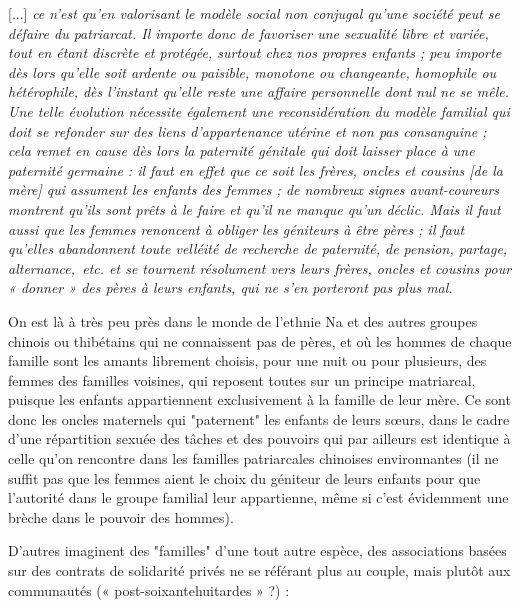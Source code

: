 \begin{displayquote}
{[...] \emph{ce n'est qu'en valorisant le modèle social non conjugal qu'une société peut se défaire du patriarcat. Il importe donc de favoriser une sexualité libre et variée, tout en étant discrète et protégée, surtout chez nos propres enfants ; peu importe dès lors qu'elle soit ardente ou paisible, monotone ou changeante, homophile ou hétérophile, dès l'instant qu'elle reste une affaire personnelle dont nul ne se mêle. Une telle évolution nécessite également une reconsidération du modèle familial qui doit se refonder sur des liens d'appartenance utérine et non pas consanguine ; cela remet en cause dès lors la paternité génitale qui doit laisser place à une paternité germaine : il faut en effet que ce soit les frères, oncles et cousins \emph{[de la mère]} qui assument les enfants des femmes ; de nombreux signes avant-coureurs montrent qu'ils sont prêts à le faire et qu'il ne manque qu'un déclic. Mais il faut aussi que les femmes renoncent à obliger les géniteurs à être pères ; il faut qu'elles abandonnent toute velléité de recherche de paternité, de pension, partage, alternance,~etc. et se tournent résolument vers leurs frères, oncles et cousins pour « donner » des pères à leurs enfants, qui ne s'en porteront pas plus mal.}}
\end{displayquote}

On est là à très peu près dans le monde de l'ethnie Na et des autres groupes chinois ou thibétains qui ne connaissent pas de pères, et où les hommes de chaque famille sont les amants librement choisis, pour une nuit ou pour plusieurs, des femmes des familles voisines, qui reposent toutes sur un principe matriarcal, puisque les enfants appartiennent exclusivement à la famille de leur mère. Ce sont donc les oncles maternels qui "paternent" les enfants de leurs sœurs, dans le cadre d'une répartition sexuée des tâches et des pouvoirs qui par ailleurs est identique à celle qu'on rencontre dans les familles patriarcales chinoises environnantes (il ne suffit pas que les femmes aient le choix du géniteur de leurs enfants pour que l'autorité dans le groupe familial leur appartienne, même si c'est évidemment une brèche dans le pouvoir des hommes). 

D'autres imaginent des "familles" d'une tout autre espèce, des associations basées sur des contrats de solidarité privés ne se référant plus au couple, mais plutôt aux communautés (« post-soixantehuitardes » ?) : 

